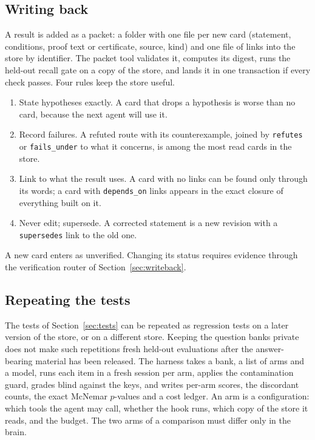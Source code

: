 \subsection{Writing back}
A result is added as a packet: a folder with one file per new card (statement, conditions, proof text or certificate, source, kind) and one file of links into the store by identifier. The packet tool validates it, computes its digest, runs the held-out recall gate on a copy of the store, and lands it in one transaction if every check passes. Four rules keep the store useful.
\begin{enumerate}[label=(\alph*)]
\item State hypotheses exactly. A card that drops a hypothesis is worse than no card, because the next agent will use it.
\item Record failures. A refuted route with its counterexample, joined by \texttt{refutes} or \texttt{fails\_under} to what it concerns, is among the most read cards in the store.
\item Link to what the result uses. A card with no links can be found only through its words; a card with \texttt{depends\_on} links appears in the exact closure of everything built on it.
\item Never edit; supersede. A corrected statement is a new revision with a \texttt{supersedes} link to the old one.
\end{enumerate}
A new card enters as \textsf{unverified}. Changing its status requires evidence through the verification router of Section~\ref{sec:writeback}.

\subsection{Repeating the tests}
The tests of Section~\ref{sec:tests} can be repeated as regression tests on a later version of the store, or on a different store. Keeping the question banks private does not make such repetitions fresh held-out evaluations after the answer-bearing material has been released. The harness takes a bank, a list of arms and a model, runs each item in a fresh session per arm, applies the contamination guard, grades blind against the keys, and writes per-arm scores, the discordant counts, the exact McNemar $p$-values and a cost ledger. An arm is a configuration: which tools the agent may call, whether the hook runs, which copy of the store it reads, and the budget. The two arms of a comparison must differ only in the brain.

